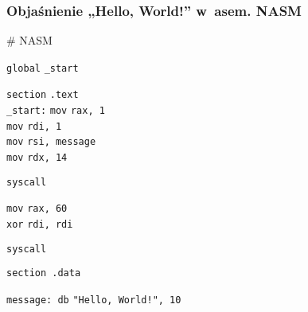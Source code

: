\documentclass[10pt,t]{beamer}
\begin{document}
\begin{frame}
  \frametitle{Objaśnienie „Hello, World!” w~asem. NASM
    \parencite{Toal-NASM-Tutorial-Ver-2024}}


  \# NASM

  \hphantom{aaaaaaaaa} \texttt{global} \hphantom{aa} \texttt{\_start} \\
  \vspace{0.8em}

  \hphantom{aaaaaaaaa} \texttt{section} \hphantom{a} \texttt{.text} \\
  \texttt{\_start:} \hphantom{a} \hspace{-0.14em}
  \texttt{mov} \hphantom{aaaaaa} \texttt{rax, 1} \\
  \hphantom{aaaaaaaaa} \texttt{mov} \hphantom{aaaaaa} \texttt{rdi, 1} \\
  \hphantom{aaaaaaaaa} \texttt{mov} \hphantom{aaaaaa}
  \texttt{rsi, message} \\
  \hphantom{aaaaaaaaa} \texttt{mov} \hphantom{aaaaaa} \texttt{rdx, 14} \\
  \vspace{0.8em}

  \hphantom{aaaaaaaaa} \texttt{syscall} \\
  \vspace{0.8em}

  \hphantom{aaaaaaaaa} \texttt{mov} \hphantom{aaaaaa} \texttt{rax, 60} \\
  \hphantom{aaaaaaaaa} \texttt{xor} \hphantom{aaaaaa} \texttt{rdi, rdi} \\
  \vspace{0.8em}

  \hphantom{aaaaaaaaa} \texttt{syscall} \\
  \vspace{0.8em}

  \hphantom{aaaaaaaaa} \texttt{section .data} \\
  \vspace{0.8em}

  \texttt{message: db} \hphantom{aaaaa} \texttt{"Hello, World!", 10}

\end{frame}
\end{document}
